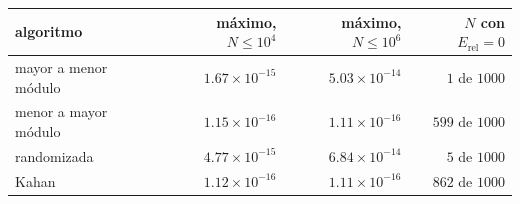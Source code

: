 \begin{tabular}{lrrr}
\toprule
algoritmo & máximo, $N \leq 10^{4}$ & máximo, $N \leq 10^{6}$ & $N$ con $E_\mathrm{rel} = 0$ \\
\midrule
mayor a menor módulo & $1.67 \times 10^{-15}$ & $5.03 \times 10^{-14}$ & $1$ de $1000$ \\
menor a mayor módulo & $1.15 \times 10^{-16}$ & $1.11 \times 10^{-16}$ & $599$ de $1000$ \\
randomizada & $4.77 \times 10^{-15}$ & $6.84 \times 10^{-14}$ & $5$ de $1000$ \\
Kahan & $1.12 \times 10^{-16}$ & $1.11 \times 10^{-16}$ & $862$ de $1000$ \\
\bottomrule
\end{tabular}
